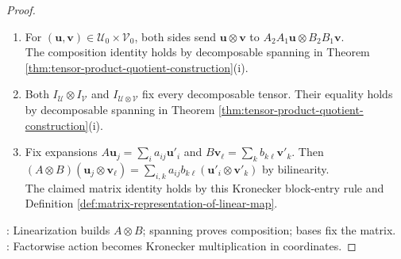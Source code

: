 \begin{theorem}
\begin{proof}
\begin{enumerate}[label=(\roman*)]
Likewise, $\tau(A,aB+bD)=a\tau(A,B)+b\tau(A,D)$ on decomposable tensors.\\
The identities extend to $\mathcal{U}\otimes\mathcal{V}$ by Theorem \ref{thm:tensor-product-quotient-construction}(i), and $\tau$ is bilinear by these identities.
\item For $(\mathbf{u},\mathbf{v})\in\mathcal{U}_0\times\mathcal{V}_0$, both sides send $\mathbf{u}\otimes\mathbf{v}$ to $A_2A_1\mathbf{u}\otimes B_2B_1\mathbf{v}$.\\
The composition identity holds by decomposable spanning in Theorem \ref{thm:tensor-product-quotient-construction}(i).
\item Both $I_{\mathcal{U}}\otimes I_{\mathcal{V}}$ and $I_{\mathcal{U}\otimes\mathcal{V}}$ fix every decomposable tensor. Their equality holds by decomposable spanning in Theorem \ref{thm:tensor-product-quotient-construction}(i).
\item Fix expansions $A\mathbf{u}_j=\sum\limits_i a_{ij}\mathbf{u}'_i$ and $B\mathbf{v}_\ell=\sum\limits_k b_{k\ell}\mathbf{v}'_k$. Then $(A\otimes B)(\mathbf{u}_j\otimes\mathbf{v}_{\ell})=\sum\limits_{i,k}a_{ij}b_{k\ell}(\mathbf{u}'_i\otimes\mathbf{v}'_k)$ by bilinearity.\\
The claimed matrix identity holds by this Kronecker block-entry rule and Definition \ref{def:matrix-representation-of-linear-map}.
\end{enumerate}
: Linearization builds $A\otimes B$; spanning proves composition; bases fix the matrix.\\
: Factorwise action becomes Kronecker multiplication in coordinates.
\end{proof}
\end{theorem}


